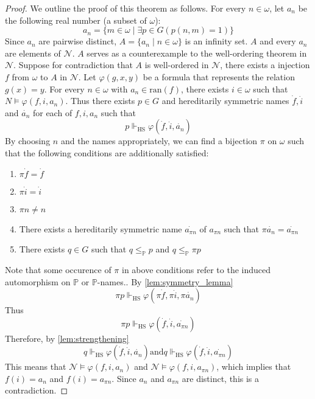 \documentclass{report}
\begin{document}
\begin{proof}
We outline the proof of this theorem as follows. 
For every $n \in \omega$, let $a_n$ be the following real number (a subset of $\omega$):
$$a_n = \{ m \in \omega \mid \exists p \in G (p(n, m) = 1) \}$$
Since $a_n$ are pairwise distinct, $A = \{ a_n \mid n \in \omega \}$ is an infinity set.
$A$ and every $a_n$ are elements of $\mathcal{N}$.
$A$ serves as a counterexample to the well-ordering theorem in $\mathcal{N}$.
Suppose for contradiction that $A$ is well-ordered in $\mathcal{N}$, there exists a injection $f$ from $\omega$ to $A$ in $\mathcal{N}$.
Let $\varphi(g,x,y)$ be a formula that represents the relation $g(x) = y$. 
For every $n \in \omega$ with $a_n \in \mathrm{ran}(f)$, there exists $i \in \omega$ such that $N \vDash \varphi(f, i, a_n)$.
Thus there exists $p \in G$ and hereditarily symmetric names $\dot{f}, \dot{i}$ and $\dot{a_n}$ for each of $f, i, a_n$ such that 
$$p \Vdash_{\mathrm{HS}} \varphi(\dot{f}, \dot{i}, \dot{a_n})$$
By choosing $n$ and the names appropriately, we can find a bijection $\pi$ on $\omega$ such that the following conditions are additionally satisfied:
\begin{enumerate}
  \item $\pi \dot{f} = \dot{f}$
  \item $\pi \dot{i} = \dot{i}$
  \item $\pi n \ne n$
  \item There exists a hereditarily symmetric name $\dot{a_{\pi n}}$ of $a_{\pi n}$ such that $\pi \dot{a_n} = \dot{a_{\pi n}}$
  \item There exists $q \in G$ such that $q \leq_{\mathbb{P}} p$ and $q \leq_{\mathbb{P}} \pi p$
\end{enumerate}
Note that some occurence of $\pi$ in above conditions refer to the induced automorphism on $\mathbb{P}$ or $\mathbb{P}$-names..
By \cref{lem:symmetry_lemma}
$$\pi p \Vdash_{\mathrm{HS}} \varphi(\pi \dot{f}, \pi \dot{i}, \pi \dot{a_n})$$
Thus 
$$\pi p \Vdash_{\mathrm{HS}} \varphi(\dot{f}, \dot{i}, \dot{a_{\pi n}})$$
Therefore, by \cref{lem:strengthening}
$$q \Vdash_{\mathrm{HS}} \varphi(\dot{f}, \dot{i}, \dot{a_n}) \mathrm{ and } q \Vdash_{\mathrm{HS}} \varphi(\dot{f}, \dot{i}, \dot{a_{\pi n}})$$
This means that $\mathcal{N} \vDash \varphi(f, i, a_n)$ and $\mathcal{N} \vDash \varphi(f, i, a_{\pi n})$, which implies that $f(i) = a_n$ and $f(i) = a_{\pi n}$.
Since $a_n$ and $a_{\pi n}$ are distinct, this is a contradiction. 
\end{proof}
 
\end{document}
